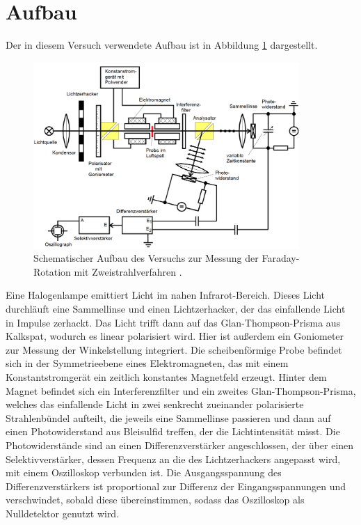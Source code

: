 \section{Aufbau}
Der in diesem Versuch verwendete Aufbau ist in Abbildung \ref{fig:aufbau} dargestellt.
\FloatBarrier
\begin{figure}[h]
    \centering
    \includegraphics[width=0.9\textwidth]{aufbau.png}
    \caption{Schematischer Aufbau des Versuchs zur Messung der Faraday-Rotation mit Zweistrahlverfahren \cite{quelle03}.}
    \label{fig:aufbau}
\end{figure}
\FloatBarrier
\noindent
Eine Halogenlampe emittiert Licht im nahen Infrarot-Bereich. Dieses Licht durchläuft eine Sammellinse und einen 
Lichtzerhacker, der das einfallende Licht in Impulse zerhackt. Das Licht trifft dann auf das Glan-Thompson-Prisma aus
Kalkspat, wodurch es linear polarisiert wird. Hier ist außerdem ein Goniometer zur Messung der Winkelstellung integriert. 
Die scheibenförmige Probe befindet sich in der Symmetrieebene eines Elektromagneten, das mit einem Konstantstromgerät 
ein zeitlich konstantes Magnetfeld erzeugt. Hinter dem Magnet befindet sich ein Interferenzfilter und ein zweites 
Glan-Thompson-Prisma, welches das einfallende Licht in zwei senkrecht zueinander polarisierte Strahlenbündel aufteilt,
die jeweils eine Sammellinse passieren und dann auf einen Photowiderstand aus Bleisulfid treffen, der die Lichtintensität misst. 
Die Photowiderstände sind an einen Differenzverstärker angeschlossen, der über einen Selektivverstärker, dessen Frequenz 
an die des Lichtzerhackers angepasst wird, mit
einem Oszilloskop verbunden ist. Die Ausgangsspannung des Differenzverstärkers ist proportional zur Differenz der 
Eingangsspannungen und verschwindet, sobald diese übereinstimmen, sodass das Oszilloskop als Nulldetektor genutzt wird.

